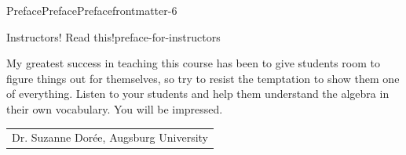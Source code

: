 \documentclass[twoside,11pt,]{book}
\numberwithin{equation}{section}
\begin{document}
\begin{preface}{Preface}{Preface}{}{Preface}{}{}{frontmatter-6}
\begin{paragraphs}{Instructors! Read this!}{preface-for-instructors}
\par
My greatest success in teaching this course has been to give students room to figure things out for themselves, so try to resist the temptation to show them one of everything. Listen to your students and help them understand the algebra in their own vocabulary. You will be impressed.%
\nopagebreak\par%
\hfill\begin{tabular}[t]{l@{}}
Dr. Suzanne Dorée, Augsburg University
\end{tabular}\\\par
\end{paragraphs}%
\end{preface}
\setcounter{tocdepth}{1}
\renewcommand*\contentsname{Contents}
\tableofcontents
\mainmatter
%
%
\typeout{************************************************}
\typeout{************************************************}
%
\end{document}

